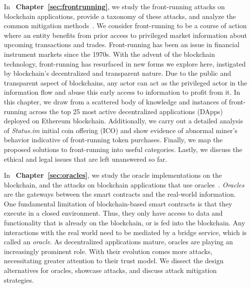 In ~\textbf{Chapter~\ref{sec:frontrunning}}, we study the front-running attacks on blockchain applications, provide a taxonomy of these attacks, and analyze the common mitigation methods~\cite{eskandari2019sok}. We consider front-running to be a course of action where an entity benefits from prior access to privileged market information about upcoming transactions and trades. Front-running has been an issue in financial instrument markets since the 1970s. With the advent of the blockchain technology, front-running has resurfaced in new forms we explore here, instigated by blockchain’s decentralized and transparent nature. Due to the public and transparent aspect of blockchains, any actor can act as the privileged actor in the information flow and abuse this early access to information to profit from it. In this chapter, we draw from a scattered body of knowledge and instances of front-running across the top 25 most active decentralized applications (DApps) deployed on Ethereum blockchain. Additionally, we carry out a detailed analysis of \textit{Status.im} initial coin offering (ICO) and show evidence of abnormal miner’s behavior indicative of front-running token purchases. Finally, we map the proposed solutions to front-running into useful categories. Lastly, we discuss the ethical and legal issues that are left unanswered so far.


In ~\textbf{Chapter~\ref{sec:oracles}}, we study the oracle implementations on the blockchain, and the attacks on blockchain applications that use oracles~\cite{eskandari2021sok}. \textit{Oracles} are the gateways between the smart contracts and the real-world information. One fundamental limitation of blockchain-based smart contracts is that they execute in a closed environment. Thus, they only have access to data and functionality that is already on the blockchain, or is fed into the blockchain. Any interactions with the real world need to be mediated by a bridge service, which is called an \textit{oracle}. As decentralized applications mature, oracles are playing an increasingly prominent role. With their evolution comes more attacks, necessitating greater attention to their trust model. We dissect the design alternatives for oracles, showcase attacks, and discuss attack mitigation strategies.


